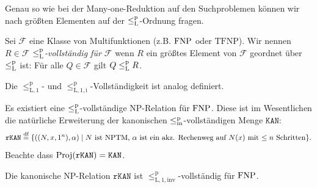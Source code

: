 Genau so wie bei der Many-one-Reduktion auf den Suchproblemen können wir nach größten Elementen auf der $\leq_\mathrm{L}^\mathrm{p}$-Ordnung fragen.

\begin{definition}
    Sei $\mathcal F$ eine Klasse von Multifunktionen (z.B. $\mathrm{FNP}$ oder $\mathrm{TFNP}$).
    Wir nennen $R\in\mathcal F$ \emph{$\leq_\mathrm{L}^\mathrm{p}$-vollständig für $\mathcal F$} wenn $R$ ein größtes Element von $\mathcal F$ geordnet über $\leq_\mathrm{L}^\mathrm{p}$ ist:
    Für alle $Q\in\mathcal F$ gilt $Q\leq_\mathrm{L}^\mathrm{p} R$.

    Die $\leq_\mathrm{L,1}^\mathrm p$- und $\leq_\mathrm{L,1,i}^\mathrm p$-Vollständigkeit ist analog definiert.
\end{definition}

Es existiert eine $\leq_\mathrm{L}^\mathrm{p}$-vollständige NP-Relation für $\mathrm{FNP}$. Diese ist im Wesentlichen die natürliche Erweiterung der kanonischen $\leq_\mathrm{m}^\mathrm{p}$-vollständigen Menge $\mathtt{KAN}$:
\[ \mathtt{rKAN} \stackrel{\text{df}}{=} \{ ((N,x,1^n), \alpha) \mid \text{$N$ ist NPTM, $\alpha$ ist ein akz. Rechenweg auf $N(x)$ mit $\leq n$ Schritten} \}. \]
Beachte dass $\operatorname{Proj}(\mathtt{rKAN})=\mathtt{KAN}$.
\begin{theorem}
    Die kanonische NP-Relation $\mathtt{rKAN}$ 
    ist $\leq_\mathrm{L,1,inv}^\mathrm p$-vollständig für $\mathrm{FNP}$.
\end{theorem}
